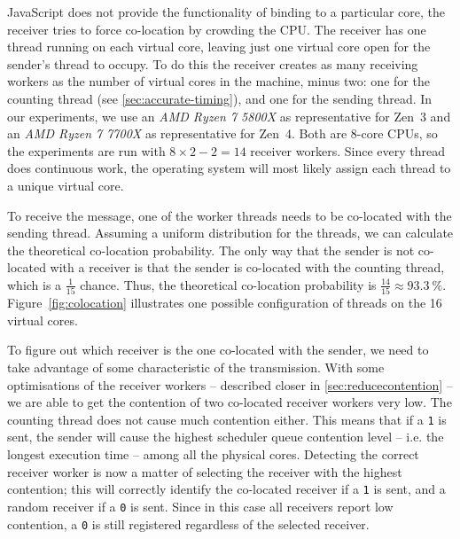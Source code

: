 \documentclass[11pt,
  titlepage=false,
  parskip=half,      %
]{scrreprt}
\begin{document}
JavaScript does not provide the functionality of binding to a particular core,
the receiver tries to force co-location by crowding the CPU.
The receiver has one thread running on each virtual core,
leaving just one virtual core open for the sender's thread to occupy.
To do this the receiver creates as many receiving workers as the number of virtual cores in the machine, minus two:
one for the counting thread (see \ref{sec:accurate-timing}), and one for the sending thread.
In our experiments, we use an \textit{AMD Ryzen 7 5800X} as representative for Zen~3 and an \textit{AMD Ryzen 7 7700X} as representative for Zen~4.
Both are 8-core CPUs, so the experiments are run with $8 \times 2 - 2 = 14$ receiver workers.
Since every thread does continuous work, the operating system will most likely assign each thread to a unique virtual core.

To receive the message, one of the worker threads needs to be co-located with the sending thread.
Assuming a uniform distribution for the threads, we can calculate the theoretical co-location probability.
The only way that the sender is not co-located with a receiver is that the sender is co-located with the counting thread,
which is a $\frac{1}{15}$ chance.
Thus, the theoretical co-location probability is $\frac{14}{15} \approx 93.3~\%$.
Figure~\ref{fig:colocation} illustrates one possible configuration of threads on the 16 virtual cores.

To figure out which receiver is the one co-located with the sender,
we need to take advantage of some characteristic of the transmission.
With some optimisations of the receiver workers -- described closer in \ref{sec:reducecontention} --
we are able to get the contention of two co-located receiver workers very low.
The counting thread does not cause much contention either.
This means that if a \texttt{1} is sent, the sender will cause the highest scheduler queue contention level -- i.e. the longest execution time --
among all the physical cores.
Detecting the correct receiver worker is now a matter of selecting the receiver with the highest contention;
this will correctly identify the co-located receiver if a \texttt{1} is sent, and a random receiver if a \texttt{0} is sent.
Since in this case all receivers report low contention, a \texttt{0} is still registered regardless of the selected receiver.
\end{document}
